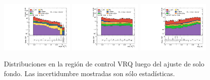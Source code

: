 \begin{figure}[ht!]
\begin{center}
    \includegraphics[width=0.32\textwidth]{images_tmp/results/fr2/can_VRQ_dphi_jetmet_afterFit.pdf}
    \includegraphics[width=0.32\textwidth]{images_tmp/results/fr2/can_VRQ_dphi_gammet_afterFit.pdf}
    \includegraphics[width=0.32\textwidth]{images_tmp/results/fr2/can_VRQ_dphi_gamjet_afterFit.pdf}

    \caption{Distribuciones en la región de control VRQ luego del ajuste de solo fondo. Las incertidumbre mostradas son sólo estadísticas.}
    \label{fig:dist_vrq_bkgonly}
  \end{center}
\end{figure}

